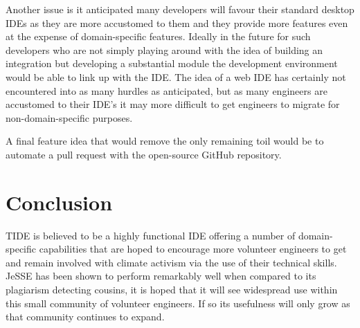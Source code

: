 \documentclass[jou,apacite]{apa6}
\begin{document}
Another issue is it anticipated many developers will favour their standard desktop IDEs as they are more accustomed to them and they provide more features even at the expense of domain-specific features. Ideally in the future for such developers who are not simply playing around with the idea of building an integration but developing a substantial module the development environment would be able to link up with the IDE. The idea of a web IDE has certainly not encountered into as many hurdles as anticipated, but as many engineers are accustomed to their IDE's it may more difficult to get engineers to migrate for non-domain-specific purposes. 

A final feature idea that would remove the only remaining toil would be to automate a pull request with the open-source GitHub repository.

\section{Conclusion}
TIDE is believed to be a highly functional IDE offering a number of domain-specific capabilities that are hoped to encourage more volunteer engineers to get and remain involved with climate activism via the use of their technical skills. JeSSE has been shown to perform remarkably well when compared to its plagiarism detecting cousins, it is hoped that it will see widespread use within this small community of volunteer engineers. If so its usefulness will only grow as that community continues to expand. 


\end{document}
